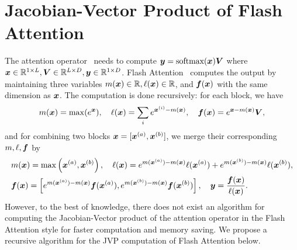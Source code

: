\section{Jacobian-Vector Product of Flash Attention}
\label{appendix:flash_attn_jvp}
The attention operator~\citep{vaswani2017attention} needs to compute ${\bm{y}} = \text{softmax}({\bm{x}}){\bm{V}}$ where ${\bm{x}}\in \mathbb{R}^{1\times L}, {\bm{V}} \in \mathbb{R}^{L\times D}, {\bm{y}} \in \mathbb{R}^{1\times D}$. Flash Attention~\citep{dao2022flashattention,dao2023flashattention2} computes the output by maintaining three variables $m({\bm{x}}) \in \mathbb{R}, \ell({\bm{x}}) \in \mathbb{R}$, and ${\bm{f}}({\bm{x}})$ with the same dimension as ${\bm{x}}$. The computation is done recursively: for each block, we have
\begin{equation*}
    m({\bm{x}}) = \max(e^{{\bm{x}}}), \quad \ell({\bm{x}}) = \sum_i e^{{\bm{x}}^{(i)} - m({\bm{x}})},\quad {\bm{f}}({\bm{x}}) = e^{{\bm{x}} - m({\bm{x}})} {\bm{V}},
\end{equation*}
and for combining two blocks ${\bm{x}} = [{\bm{x}}^{(a)}, {\bm{x}}^{(b)}]$, we merge their corresponding $m, \ell, {\bm{f}}$ by
\begin{equation*}
\begin{aligned}
    &m({\bm{x}}) = \max\left( {\bm{x}}^{(a)}, {\bm{x}}^{(b)} \right),
    \quad \ell({\bm{x}}) = e^{m({\bm{x}}^{(a)}) - m({\bm{x}})}\ell({\bm{x}}^{(a)}) + e^{m({\bm{x}}^{(b)}) - m({\bm{x}})}\ell({\bm{x}}^{(b)}), \\
    &{\bm{f}}({\bm{x}}) = \left[e^{m({\bm{x}}^{(a)}) - m({\bm{x}})}{\bm{f}}({\bm{x}}^{(a)}), e^{m({\bm{x}}^{(b)}) - m({\bm{x}})}{\bm{f}}({\bm{x}}^{(b)})\right],
    \quad {\bm{y}} = \frac{{\bm{f}}({\bm{x}})}{\ell({\bm{x}})}.
\end{aligned}
\end{equation*}
However, to the best of knowledge, there does not exist an algorithm for computing the Jacobian-Vector product of the attention operator in the Flash Attention style for faster computation and memory saving. We propose a recursive algorithm for the JVP computation of Flash Attention below.

